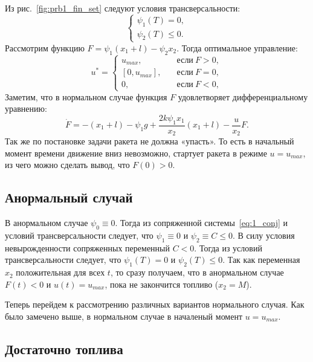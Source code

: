 \documentclass[12pt, a4paper]{article} %
\renewcommand{\le}{\leqslant}
\begin{document}
Из рис.~\ref{fig:prb1_fin_set} следуют условия трансверсальности:
\begin{equation}\label{eq:1_trans}
    \begin{cases}
        \psi_1(T) = 0,\\
        \psi_2(T) \le 0.
    \end{cases} 
\end{equation} 
Рассмотрим функцию $F = \psi_1(x_1 + l) - \psi_2 x_2$.
Тогда оптимальное управление:
\begin{equation}\label{eq:1_opt_control}
    u^* = \left\{
    \begin{aligned}
        u_{max}, \quad &\text{если}\ F > 0, \\
        [0, u_{max}], \quad &\text{если}\ F = 0, \\
        0, \quad &\text{если}\ F < 0,
    \end{aligned} 
    \right.
\end{equation} 
Заметим, что в нормальном случае функция $F$ удовлетворяет 
дифференциальному уравнению:
\begin{equation}\label{eq:1_F_diffeq}
     \dot F = -(x_1 + l) - \psi_1g + \frac{2k\psi_1x_1}{x_2}(x_1 + l)
     -\frac{u}{x_2}F
.\end{equation} 
Так же по постановке задачи ракета не должна «упасть».
То есть в начальный момент времени движение вниз невозможно, 
стартует ракета в режиме $u = u_{max}$, из чего можно сделать вывод,
что $F(0) > 0$.

\subsection{Анормальный случай}

В анормальном случае  $\psi_0 \equiv 0$. 
Тогда из сопряженной системы~\eqref{eq:1_conj} и условий трансверсальности следует, что 
$\psi_1 \equiv 0$ и $\psi_2 \equiv C \le 0$.
В силу условия невырожденности сопряженных переменный $C < 0$. 
Тогда из условий трансверсальности следует, что 
$\psi_1(T) = 0$ и $\psi_2(T) \le 0$.
Так как переменная $x_2$ положительная для всех $t$, 
то сразу получаем, что в анормальном случае  $F(t) < 0$ и  $u(t) = u_{max}$,
пока не закончится топливо ($x_2 = M$).

Теперь перейдем к рассмотрению различных вариантов нормального случая.
Как было замечено выше, в нормальном случае в началеный момент $u = u_{max}$.

\subsection{Достаточно топлива}
\end{document}
